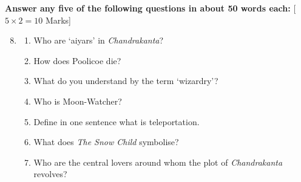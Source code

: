 \documentclass[11pt,a4paper]{article}
\begin{document}
\noindent   \textbf{Answer any five of the following questions in about 50 words each:} \hfill [$5  \times 2 = 10$ Marks]


\begin{enumerate}[label=   \textbf{\arabic*.}]
    \setcounter{enumii}{7}
    \item 
    
\begin{enumerate}[label=(\alph*)]
        \item Who are `aiyars' in   \textit{Chandrakanta}?
        \item How does Poolicoe die?
        \item What do you understand by the term `wizardry'?
        \item Who is Moon-Watcher?
        \item Define in one sentence what is teleportation.
        \item What does   \textit{The Snow Child} symbolise?
        \item Who are the central lovers around whom the plot of   \textit{Chandrakanta} revolves?
    \end{enumerate}
\end{enumerate}
\end{document}
